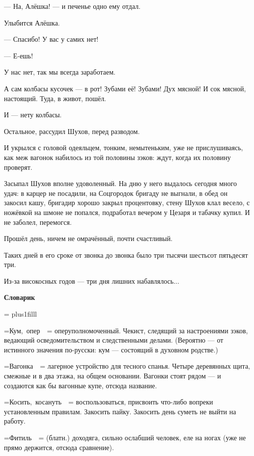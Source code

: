 --- На, Алёшка! --- и печенье одно ему отдал.

Улыбится Алёшка.

--- Спасибо! У вас у самих нет!

--- Е-ешь!

У нас нет, так мы всегда заработаем.

А сам колбасы кусочек --- в рот! Зубами её! Зубами! Дух мясной! И сок мясной, настоящий. Туда, в
живот, пошёл.

И --- нету колбасы.

Остальное, рассудил Шухов, перед разводом.

И укрылся с головой одеяльцем, тонким, немытеньким, уже не прислушиваясь, как меж вагонок
набилось из той половины зэков: ждут, когда их половину проверят.


Засыпал Шухов вполне удоволенный. На дню у него выдалось сегодня много удач: в карцер не
посадили, на Соцгородок бригаду не выгнали, в обед он закосил кашу, бригадир хорошо закрыл
процентовку, стену Шухов клал весело, с ножёвкой на шмоне не попался, подработал вечером у
Цезаря и табачку купил. И не заболел, перемогся.

Прошёл день, ничем не омрачённый, почти счастливый.


Таких дней в его сроке от звонка до звонка было три тысячи шестьсот пятьдесят три.

Из-за високосных годов --- три дня лишних набавлялось...

\vfil\eject
\lineskip=1pt
\baselineskip=12pt
\centerline{\bf Словарик}
\vskip 3mm
\footline={\hfil}
\parskip=0pt plus1filll
\tenrm
\def\hangfrom#1{\setbox0=\hbox{\tenit#1 \ }\hangindent= \noindent {} \ignorespaces}

\hangfrom{Кум, опер} оперуполномоченный. Чекист, следящий за настроениями зэков, ведающий
осведомительством и следственными делами. (Вероятно --- от истинного значения по-русски:
{\tensl кум\/} --- состоящий в духовном родстве.)

\hangfrom{Вагонка} лагерное устройство для тесного спанья. Четыре деревянных щита, смежные и в
два этажа, на общем основании. Вагонки стоят рядом --- и создаются как бы вагонные купе, отсюда
название.

\hangfrom{Косить, косануть} воспользоваться, присвоить что-либо вопреки установленным правилам.
{\tensl Закосить пайку. Закосить день} суметь не выйти на работу.

\hangfrom{Фитиль} (блатн.) доходяга, сильно ослабший человек, еле на ногах (уже не прямо держится,
отсюда сравнение).

